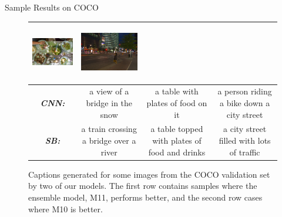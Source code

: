 \documentclass{beamer}
\newcommand{\mcCell}[1]{\multicolumn{1}{|c|}{#1}}
\begin{document}
\begin{frame}{Sample Results on COCO}
\begin{figure}[h]
\begin{center}
{\begin{tabular}{c|c|c|c|}
    \includegraphics[width=0.25\linewidth,height=2.5cm]{images/COCO_val2014_000000218404.jpg} &
    \includegraphics[width=0.25\linewidth,height=2.5cm]{images/COCO_val2014_000000119516.jpg} \\\hline
    \mcCell{\textbf{\em\scriptsize CNN:}}& \parbox[c][][c]{0.25\linewidth}{\smallskip \scriptsize a view of a bridge in the snow\smallskip} &
     \parbox[c][][c]{0.25\linewidth}{\smallskip \scriptsize a table with plates of food on it\smallskip}&
     \parbox[c][][c]{0.25\linewidth}{\smallskip \scriptsize a person riding a bike down a city street\smallskip}\\\hline
     \mcCell{\textbf{\em\scriptsize SB:}}& \parbox[c][][c]{0.25\linewidth}{\smallskip \scriptsize a train crossing a bridge over a river\smallskip} &
     \parbox[c][][c]{0.25\linewidth}{\smallskip \scriptsize a table topped with plates of food and drinks\smallskip}&
     \parbox[c][][c]{0.25\linewidth}{\smallskip \scriptsize a city street filled with lots of traffic\smallskip}\\\hline
  \end{tabular}
  }
  \end{center}
  \caption{Captions generated for some images from the COCO validation set by two of our
    models. The first row contains samples where the ensemble model,
    M11, performs better, and the second row cases where M10 is
    better.}
  \label{fig:cococapSamps}
\end{figure}

\end{frame}
\end{document}
